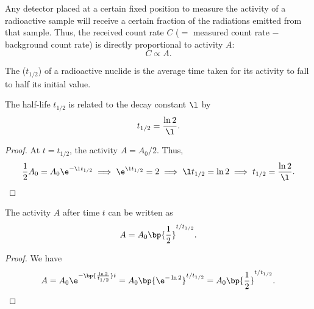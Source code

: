 Any detector placed at a certain fixed position to measure the activity of a radioactive sample will receive a certain fraction of the radiations emitted from that sample. Thus, the received count rate $C$ ($=$ measured count rate $-$ background count rate) is directly proportional to activity $A$: \[C \propto A.\]

\begin{definition}
    The  ($t_{1/2}$) of a radioactive nuclide is the average time taken for its activity to fall to half its initial value.
\end{definition}

\begin{proposition}
    The half-life $t_{1/2}$ is related to the decay constant $\l$ by \[t_{1/2} = \frac{\ln 2}{\l}.\]
\end{proposition}
\begin{proof}
    At $t = t_{1/2}$, the activity $A = A_0/2$. Thus, \[\frac12 A_0 = A_0 \e^{-\l t_{1/2}} \implies \e^{\l t_{1/2}} = 2 \implies \l t_{1/2} = \ln 2 \implies t_{1/2} = \frac{\ln 2}{\l}.\]
\end{proof}

\begin{corollary}
    The activity $A$ after time $t$ can be written as \[A = A_0 \bp{\frac12}^{t/t_{1/2}}.\]
\end{corollary}
\begin{proof}
    We have \[A = A_0 \e^{-\bp{\frac{\ln 2}{t_{1/2}}} t} = A_0 \bp{\e^{-\ln 2}}^{t/t_{1/2}} = A_0 \bp{\frac12}^{t/t_{1/2}}.\]
\end{proof}